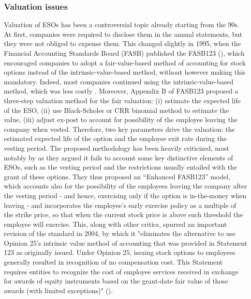 \subsubsection{Valuation issues}
    Valuation of ESOs has been a controversial topic already starting from the 90s. At first, companies were required to disclose them in the annual statements, but they were not obliged to expense them. This changed slightly in 1995, when the Financial Accounting Standards Board (FASB) published the FASB123 (\cite{fasb123}), which encouraged companies to adopt a fair-value-based method of accounting for stock options instead of the intrinsic-value-based method, without however making this mandatory. Indeed, most companies continued using the intrinsic-value-based method, which was less costly \cite{hull2004value}. 
    Moreover, Appendix B of FASB123 proposed a three-step valuation method for the fair valuation: (i) estimate the expected life of the ESO, (ii) use Black-Scholes or CRR binomial method to estimate the value, (iii) adjust ex-post to account for possibility of the employee leaving the company when vested. Therefore, two key parameters drive the valuation: the estimated expected life of the option and the employee exit rate during the vesting period. The proposed methodology has been heavily criticized, most notably by \cite{hull2004value} as they argued it fails to account some key distinctive elements of ESOs, such as the vesting period and the restrictions usually entailed with the grant of these options. They thus proposed an ``Enhanced FASB123'' model, which accounts also for the possibility of the employees leaving the company after the vesting period - and hence, exercising only if the option is in-the-money when leaving - and incorporates the employee's early exercise policy as a multiple of the strike price, so that when the current stock price is above such threshold the employee will exercise. 
    This, along with other critics, spurred an important revision of the standard in 2004, by which it "eliminates the alternative to use Opinion 25’s intrinsic value method of accounting that was provided in Statement 123 as originally issued. Under Opinion 25, issuing stock options to employees generally resulted in recognition of no compensation cost. This Statement requires entities to recognize the cost of employee services received in exchange for awards of equity instruments based on the grant-date fair value of those awards (with limited exceptions)" (\cite{fasb123_revised}).

